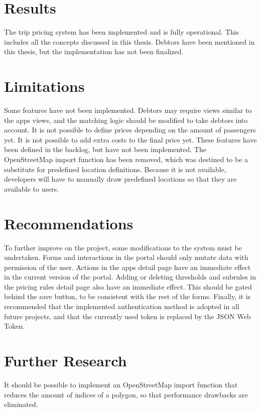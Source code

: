 \section{Results}
The trip pricing system has been implemented and is fully operational. This includes all the concepts discussed in this thesis. Debtors have been mentioned in this thesis, but the implementation has not been finalized.

\section{Limitations}
Some features have not been implemented. Debtors may require views similar to the apps views, and the matching logic should be modified to take debtors into account. It is not possible to define prices depending on the amount of passengers yet. It is not possible to add extra costs to the final price yet. These features have been defined in the backlog, but have not been implemented. The OpenStreetMap import function has been removed, which was destined to be a substitute for predefined location definitions. Because it is not available, developers will have to manually draw predefined locations so that they are available to users.

\section{Recommendations}
To further improve on the project, some modifications to the system must be undertaken. Forms and interactions in the portal should only mutate data with permission of the user. Actions in the apps detail page have an immediate effect in the current version of the portal. Adding or deleting thresholds and subrules in the pricing rules detail page also have an immediate effect. This should be gated behind the save button, to be consistent with the rest of the forms. Finally, it is recommended that the implemented authentication method is adopted in all future projects, and that the currently used token is replaced by the JSON Web Token.

\section{Further Research}
It should be possible to implement an OpenStreetMap import function that reduces the amount of indices of a polygon, so that performance drawbacks are eliminated.
